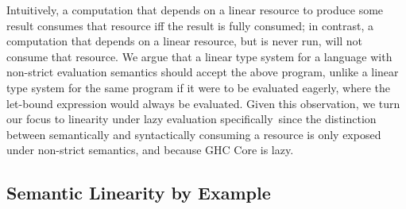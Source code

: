 \documentclass[acmsmall,review,screen]{acmart}
\newcommand{\ROUNDTWO}[1]{{\color{red}#1}}
\begin{document}
%
Intuitively, a computation that depends on a linear resource to produce some
result consumes that resource iff the result is fully consumed; in
contrast, a computation that depends on a linear resource, but is never run,
will not consume that resource.
%
We argue that a linear type system for a language with non-strict evaluation
semantics should accept the above program, unlike a linear type system for the
same program if it were to be evaluated eagerly, where the let-bound
expression would always be evaluated.
%
Given this observation, %
%
we turn our focus to linearity under lazy evaluation
\ROUNDTWO{specifically} since the distinction between semantically and
syntactically consuming a resource is only exposed under non-strict semantics,
and because GHC Core is lazy.



% 
% 
% 

\subsection{Semantic Linearity by Example\label{sec:semantic-linearity-examples}}
\end{document}
